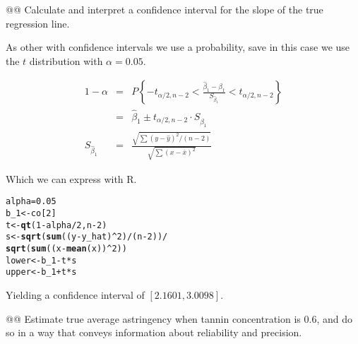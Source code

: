 \documentclass[10pt]{article}\usepackage[]{graphicx}\usepackage[]{xcolor}
\makeatletter
\newcommand{\hlnum}[1]{\textcolor[rgb]{0.686,0.059,0.569}{#1} }%
\newcommand{\hlopt}[1]{\textcolor[rgb]{0,0,0}{#1} }%
\newcommand{\hlstd}[1]{\textcolor[rgb]{0.345,0.345,0.345}{#1} }%
\newcommand{\hlkwb}[1]{\textcolor[rgb]{0.69,0.353,0.396}{#1} }%
\newcommand{\hlkwd}[1]{\textcolor[rgb]{0.737,0.353,0.396}{\textbf{#1} } }%
\newenvironment{kframe}{%
 \def\at@end@of@kframe{}%
 \ifinner\ifhmode%
  \def\at@end@of@kframe{\end{minipage} }%
  \begin{minipage}{\columnwidth}%
 \fi\fi%
 \def\FrameCommand##1{\hskip\@totalleftmargin \hskip-\fboxsep
 \colorbox{shadecolor}{##1}\hskip-\fboxsep
     \hskip-\linewidth \hskip-\@totalleftmargin \hskip\columnwidth}%
 \MakeFramed {\advance\hsize-\width
   \@totalleftmargin\z@ \linewidth\hsize
   \@setminipage} }%
 {\par\unskip\endMakeFramed%
 \at@end@of@kframe}
\newenvironment{knitrout}{}{} %
\makeatother
\begin{document}
\begin{easylist}[enumerate]
    @@ Calculate and interpret a confidence interval for the slope of the true regression line.\newline

    As other with confidence intervals we use a probability, save in this case we use the $t$ distribution with
    $\alpha=0.05$.

    \begin{equation}
        \begin{aligned}
            1 - \alpha &=& P\left\{ -t_{\alpha / 2, n - 2} <
                \frac{\hat{\beta}_1 - \beta_1}{S_{\hat{\beta}_1} } <
                t_{\alpha/2, n - 2} \right\}\\
            &=& \hat{\beta}_1 \pm t_{\alpha / 2, n - 2} \cdot S_{\hat{\beta}_1}\\
            S_{\hat{\beta}_1} &=& \frac{\sqrt{\sum {\left( y - \hat{y} \right)}^2 / (n - 2)} }
                                        {\sqrt{\sum {\left( x - \overline{x} \right)}^2} }
        \end{aligned}
    \end{equation}

    Which we can express with R.

\begin{knitrout}
\color{fgcolor}\begin{kframe}
\begin{alltt}
         \hlstd{alpha} \hlkwb{=} \hlnum{0.05}
         \hlstd{b_1} \hlkwb{<-} \hlstd{co[}\hlnum{2}\hlstd{]}
         \hlstd{t} \hlkwb{<-} \hlkwd{qt}\hlstd{(}\hlnum{1} \hlopt{-} \hlstd{alpha} \hlopt{/} \hlnum{2}\hlstd{, n} \hlopt{-} \hlnum{2}\hlstd{)}
         \hlstd{s} \hlkwb{<-} \hlkwd{sqrt}\hlstd{(}\hlkwd{sum}\hlstd{((y} \hlopt{-} \hlstd{y_hat)}\hlopt{^}\hlnum{2}\hlstd{)} \hlopt{/} \hlstd{(n} \hlopt{-} \hlnum{2}\hlstd{))} \hlopt{/}
                \hlkwd{sqrt}\hlstd{(}\hlkwd{sum}\hlstd{((x} \hlopt{-} \hlkwd{mean}\hlstd{(x))}\hlopt{^}\hlnum{2}\hlstd{))}
         \hlstd{lower} \hlkwb{<-} \hlstd{b_1} \hlopt{-} \hlstd{t} \hlopt{*} \hlstd{s}
         \hlstd{upper} \hlkwb{<-} \hlstd{b_1} \hlopt{+} \hlstd{t} \hlopt{*} \hlstd{s}
\end{alltt}
\end{kframe}
\end{knitrout}


    Yielding a confidence interval of $\boxed{\left[ 2.1601, 3.0098 \right]}$.

    @@ Estimate true average astringency when tannin concentration is 0.6, and do so in a way that conveys information
    about reliability and precision.\newline


\end{easylist}
\end{document}
